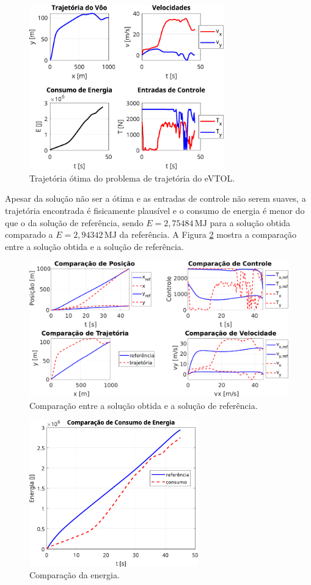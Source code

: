 \begin{figure}[H]
    \centering
    \includegraphics[width=0.75\textwidth]{Cap4/figuras/evtol.pdf}
    \caption{Trajetória ótima do problema de trajetória do eVTOL.}
    \label{fig:resultados-evtol}
\end{figure}

Apesar da solução não ser a ótima e as entradas de controle não serem suaves, a trajetória encontrada é fisicamente plausível e o consumo de energia é menor do que o da solução de referência, sendo $E=2,75484 \, \si{\mega\joule}$ para a solução obtida comparado a $E=2,94342 \, \si{\mega\joule}$ da referência. A Figura \ref{fig:resultados-evtol-comparacao} mostra a comparação entre a solução obtida e a solução de referência.

\begin{figure}[H]
    \centering
    \includegraphics[width=\textwidth]{Cap4/figuras/evtol-comparacao.pdf}
    \caption{Comparação entre a solução obtida e a solução de referência.}
    \label{fig:resultados-evtol-comparacao}
\end{figure}

\begin{figure}[H]
    \centering
    \includegraphics[width=0.65\textwidth]{Cap4/figuras/evtol-comparacao-energia.pdf}
    \caption{Comparação da energia.}
    \label{fig:resultados-evtol-comparacao-energia}
\end{figure}
